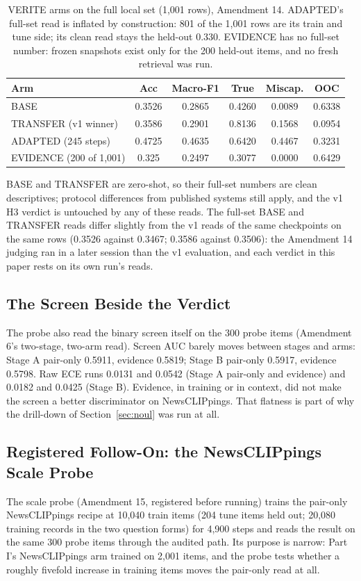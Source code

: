 \documentclass{article} %
\begin{document}
\begin{table}[t]
\centering
\small
\caption{VERITE arms on the full local set (1,001 rows), Amendment 14. ADAPTED's full-set read is inflated by construction: 801 of the 1,001 rows are its train and tune side; its clean read stays the held-out 0.330. EVIDENCE has no full-set number: frozen snapshots exist only for the 200 held-out items, and no fresh retrieval was run.}
\label{tab:veritefull}
\begin{tabular}{lccccc}
\toprule
Arm & Acc & Macro-F1 & True & Miscap. & OOC \\
\midrule
BASE & 0.3526 & 0.2865 & 0.4260 & 0.0089 & 0.6338 \\
TRANSFER (v1 winner) & 0.3586 & 0.2901 & 0.8136 & 0.1568 & 0.0954 \\
ADAPTED (245 steps) & 0.4725 & 0.4635 & 0.6420 & 0.4467 & 0.3231 \\
EVIDENCE (200 of 1,001) & 0.325 & 0.2497 & 0.3077 & 0.0000 & 0.6429 \\
\bottomrule
\end{tabular}
\end{table}

BASE and TRANSFER are zero-shot, so their full-set numbers are clean descriptives; protocol differences from published systems still apply, and the v1 H3 verdict is untouched by any of these reads. The full-set BASE and TRANSFER reads differ slightly from the v1 reads of the same checkpoints on the same rows (0.3526 against 0.3467; 0.3586 against 0.3506): the Amendment 14 judging ran in a later session than the v1 evaluation, and each verdict in this paper rests on its own run's reads.

\subsection{The Screen Beside the Verdict}
The probe also read the binary screen itself on the 300 probe items (Amendment 6's two-stage, two-arm read). Screen AUC barely moves between stages and arms: Stage A pair-only 0.5911, evidence 0.5819; Stage B pair-only 0.5917, evidence 0.5798. Raw ECE runs 0.0131 and 0.0542 (Stage A pair-only and evidence) and 0.0182 and 0.0425 (Stage B). Evidence, in training or in context, did not make the screen a better discriminator on NewsCLIPpings. That flatness is part of why the drill-down of Section~\ref{sec:noul} was run at all.

\subsection{Registered Follow-On: the NewsCLIPpings Scale Probe}
The scale probe (Amendment 15, registered before running) trains the pair-only NewsCLIPpings recipe at 10,040 train items (204 tune items held out; 20,080 training records in the two question forms) for 4,900 steps and reads the result on the same 300 probe items through the audited path. Its purpose is narrow: Part I's NewsCLIPpings arm trained on 2,001 items, and the probe tests whether a roughly fivefold increase in training items moves the pair-only read at all.
\end{document}

